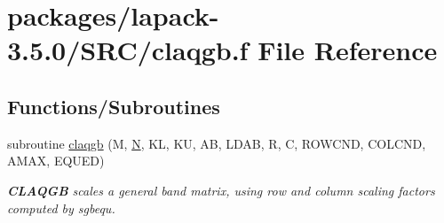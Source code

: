 \hypertarget{claqgb_8f}{}\section{packages/lapack-\/3.5.0/\+S\+R\+C/claqgb.f File Reference}
\label{claqgb_8f}
\subsection*{Functions/\+Subroutines}
\begin{DoxyCompactItemize}
\item 
subroutine \hyperlink{group__complexGBauxiliary_gace4fc1b659b18893679cc09dd8b5b998}{claqgb} (M, \hyperlink{polmisc_8c_a0240ac851181b84ac374872dc5434ee4}{N}, K\+L, K\+U, A\+B, L\+D\+A\+B, R, C, R\+O\+W\+C\+N\+D, C\+O\+L\+C\+N\+D, A\+M\+A\+X, E\+Q\+U\+E\+D)
\begin{DoxyCompactList}\small\item\em {\bfseries C\+L\+A\+Q\+G\+B} scales a general band matrix, using row and column scaling factors computed by sgbequ. \end{DoxyCompactList}\end{DoxyCompactItemize}
